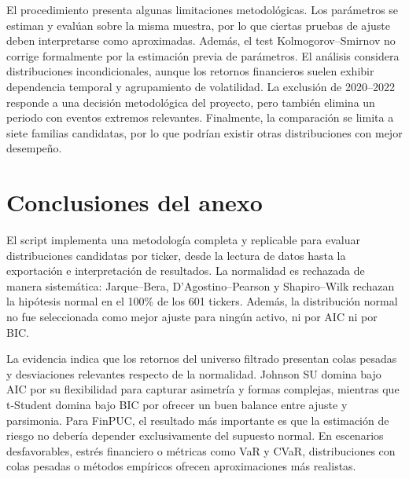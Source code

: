 El procedimiento presenta algunas limitaciones metodol\'ogicas. Los par\'ametros se estiman y eval\'uan sobre la misma muestra, por lo que ciertas pruebas de ajuste deben interpretarse como aproximadas. Adem\'as, el test Kolmogorov--Smirnov no corrige formalmente por la estimaci\'on previa de par\'ametros. El an\'alisis considera distribuciones incondicionales, aunque los retornos financieros suelen exhibir dependencia temporal y agrupamiento de volatilidad. La exclusi\'on de 2020--2022 responde a una decisi\'on metodol\'ogica del proyecto, pero tambi\'en elimina un periodo con eventos extremos relevantes. Finalmente, la comparaci\'on se limita a siete familias candidatas, por lo que podr\'ian existir otras distribuciones con mejor desempe\~no.

\section*{Conclusiones del anexo}

El script implementa una metodolog\'ia completa y replicable para evaluar distribuciones candidatas por ticker, desde la lectura de datos hasta la exportaci\'on e interpretaci\'on de resultados. La normalidad es rechazada de manera sistem\'atica: Jarque--Bera, D'Agostino--Pearson y Shapiro--Wilk rechazan la hip\'otesis normal en el 100\% de los 601 tickers. Adem\'as, la distribuci\'on normal no fue seleccionada como mejor ajuste para ning\'un activo, ni por AIC ni por BIC.

La evidencia indica que los retornos del universo filtrado presentan colas pesadas y desviaciones relevantes respecto de la normalidad. Johnson SU domina bajo AIC por su flexibilidad para capturar asimetr\'ia y formas complejas, mientras que t-Student domina bajo BIC por ofrecer un buen balance entre ajuste y parsimonia. Para FinPUC, el resultado m\'as importante es que la estimaci\'on de riesgo no deber\'ia depender exclusivamente del supuesto normal. En escenarios desfavorables, estr\'es financiero o m\'etricas como VaR y CVaR, distribuciones con colas pesadas o m\'etodos emp\'iricos ofrecen aproximaciones m\'as realistas.
